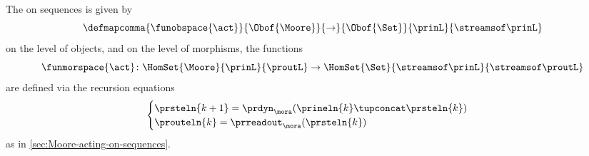 \begin{definition}
    \label{def:moore-standard-action-on-sequences}
    The  on sequences is given by
    \begin{equation}
        \defmapcomma{\funobspace{\act}}
        {\Obof{\Moore}}
        {\to}
        {\Obof{\Set}}
        {\prinL}
        {\streamsof\prinL}
    \end{equation}
    on the level of objects, and on the level of morphisms, the functions
    \begin{equation}
        \funmorspace{\act} \colon \HomSet{\Moore}{\prinL}{\proutL} \to \HomSet{\Set}{\streamsof\prinL }{\streamsof\proutL}
    \end{equation}
    are defined via the recursion equations
    \begin{equation}
        \begin{cases}
            \prsteln{k+1} = \prdyn_\mora(\prineln{k} \tupconcat \prsteln{k}) \\
            \prouteln{k} = \prreadout_\mora(\prsteln{k})
        \end{cases}
    \end{equation}
    as in \cref{sec:Moore-acting-on-sequences}.
\end{definition}

